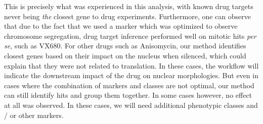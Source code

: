 This is precisely what was experienced in this analysis, with known
drug targets never being \textit{the} closest gene to drug
experiments. Furthermore, one can observe that due to the fact that we
used a marker which was optimized to observe chromosome segregation, drug target
inference performed well on mitotic hits \textit{per se}, such as
VX680. For other drugs such as Anisomycin, our method identifies
closest genes based on their impact on the nucleus when silenced,
which could explain that they were not related to translation. In
these cases, the workflow will indicate the downstream impact of the
drug on nuclear morphologies. But even in cases where the
combination of markers and classes are not optimal, our method can
still identify hits and group them together. In some cases however,
no effect at all was observed. In these cases, we will need additional
phenotypic classes and / or other markers. 


